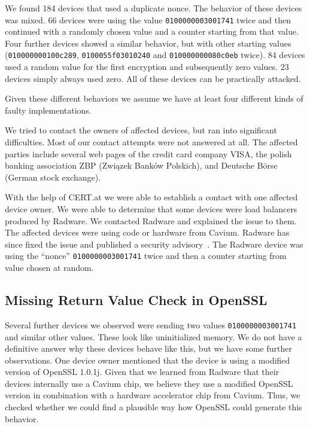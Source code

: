 We found 184 devices that used a duplicate nonce. The behavior of these devices was mixed.
66 devices were using the value \texttt{0100000003001741} twice and then continued with a randomly chosen value and a counter
starting from that value. Four further devices showed a similar behavior, but with other starting values (\texttt{010000000100c289},
\texttt{0100055f03010240} and \texttt{010000000080c0eb} twice).
84 devices used a random value for the first encryption and subsequently
zero values. 23 devices simply always used zero. All of these devices can be practically attacked.

Given these different behaviors we assume we have at least four different kinds of faulty implementations.

We tried to contact the owners of affected devices, but ran into significant difficulties. Most of our contact
attempts were not answered at all. The affected
parties include several web pages of the credit card company VISA, the polish banking association ZBP
(Związek Banków Polskich), and Deutsche Börse (German stock exchange).

With the help of CERT.at we were able to establish a contact with one affected device owner.
We were able to determine that some devices were load balancers produced by Radware. We contacted Radware and explained the issue to them. The affected devices
were using code or hardware from Cavium. Radware has since fixed the issue and published a security advisory~\cite{radware2016}.
The Radware device was using the ``nonce'' \texttt{0100000003001741} twice and then a counter starting from value chosen at random.

\subsection{Missing Return Value Check in OpenSSL}

Several further devices we observed were sending two values \texttt{0100000003001741} and similar other values.
These look like uninitialized memory.
We do not have a definitive answer why these devices behave like this, but we have some further observations.
One device owner mentioned that the device is using a modified version of OpenSSL 1.0.1j. 
Given that we learned from Radware that their devices internally use a Cavium chip, we believe
they use a modified OpenSSL version in combination with a hardware accelerator chip from Cavium.
Thus, we checked whether we could find a plausible way how OpenSSL could generate this behavior.


